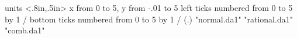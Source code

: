 \beginpicture
  \setcoordinatesystem units <.8in,.5in>
  \setplotarea x from 0 to 5, y from -.01 to 5 
  \axis left  
    ticks numbered from 0 to 5 by 1 /
  \axis bottom  
    ticks numbered from 0 to 5 by 1 /
 \setquadratic
  \setdots <20pt>
  \setplotsymbol ({\rm .})
 \plot "normal.da1" 
 \plot "rational.da1" 
 \plot "comb.da1" 
\endpicture
